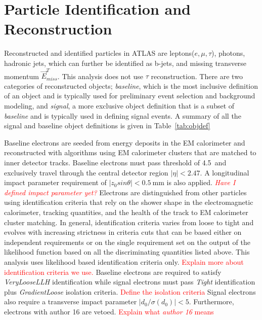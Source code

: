 \section{Particle Identification and Reconstruction}
\label{sec:obj:reco}

Reconstructed and identified particles in ATLAS are leptons($e, \mu, \tau$), photons, hadronic jets, which can further be identified as b-jets, and missing transverse momentum $\vec{E}^T_{miss}$.  This analysis does not use $\tau$ reconstruction.  There are two categories of reconstructed objects; \textit{baseline}, which is the most inclusive definition of an object and is typically used for preliminary event selection and background modeling, and \textit{signal}, a more exclusive object definition that is a subset of \textit{baseline} and is typically used in defining signal events.  A summary of all the signal and baseline object definitions is given in Table~\ref{tab:objdef}

Baseline electrons are seeded from energy deposits in the EM calorimeter and reconstructed with algorithms using EM calorimeter clusters that are matched to inner detector tracks.  Baseline electrons must pass \pt{} threshold of 4.5\GeV~and exclusively travel through the central detector region $|\eta | < 2.47$.  A longitudinal impact parameter requirement of $|z_0sin\theta| < 0.5~\mathrm{mm}$ is also applied. \textcolor{red}{\textit{Have I defined impact parameter yet?}} Electrons are distinguished from other particles using identification criteria that rely on the shower shape in the electromagnetic calorimeter, tracking quantities, and the health of the track to EM calorimeter cluster matching.  In general, identification criteria varies from loose to tight and evolves with increasing strictness in criteria cuts that can be based either on independent requirements or on the single requirement set on the output of the likelihood function based on all the discriminating quantities listed above.  This analysis uses likelihood based identification criteria only.  \textcolor{red}{Explain more about identification criteria we use.}  Baseline electrons are required to satisfy \textit{VeryLooseLLH} identification while signal electrons must pass \textit{Tight} identification plus \textit{GradientLoose} isolation criteria. \textcolor{red}{Define the isolation criteria}  Signal electrons also require a transverse impact parameter $|d_0/\sigma(d_0)| < 5$. Furthermore, electrons with author 16 are vetoed.  \textcolor{red}{Explain what \textit{author 16} means}

